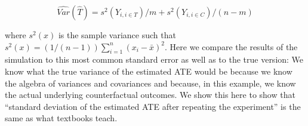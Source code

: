 \documentclass[
  12pt,
]{book}
\newenvironment{Shaded}{\begin{snugshade}}{\end{snugshade}}
\newcommand{\CommentTok}[1]{\textcolor[rgb]{0.56,0.35,0.01}{\textit{#1}}}
\newcommand{\DecValTok}[1]{\textcolor[rgb]{0.00,0.00,0.81}{#1}}
\newcommand{\KeywordTok}[1]{\textcolor[rgb]{0.13,0.29,0.53}{\textbf{#1}}}
\newcommand{\NormalTok}[1]{#1}
\newcommand{\OperatorTok}[1]{\textcolor[rgb]{0.81,0.36,0.00}{\textbf{#1}}}
\newcommand{\StringTok}[1]{\textcolor[rgb]{0.31,0.60,0.02}{#1}}
\theoremstyle{definition}
\theoremstyle{definition}
\theoremstyle{definition}
\theoremstyle{remark}
\begin{document}
\begin{equation}
\widehat{Var}(\hat{T})  =  s^2(Y_{i,i \in T})/m + s^2(Y_{i,i \in C})/(n-m)
\end{equation}

where \(s^2(x)\) is the sample variance such that
\(s^2(x) = (1/(n-1))\sum^n_{i = 1}(x_i-\bar{x})^2\). Here we compare the
results of the simulation to this most common standard error as well as
to the true version: We know what the true variance of the estimated ATE
would be because we know the algebra of variances and covariances and
because, in this example, we know the actual underlying counterfactual
outcomes. We show this here to show that ``standard deviation of the
estimated ATE after repeating the experiment'' is the same as what
textbooks teach.

\begin{Shaded}
\end{Shaded}
\end{document}
